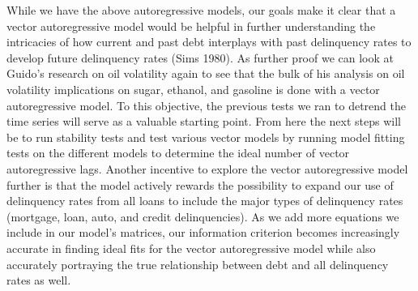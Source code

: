 \documentclass[11pt, oneside]{article}   	%
\begin{document}
While we have the above autoregressive models, our goals make it clear that a vector autoregressive model would be helpful in further understanding the intricacies of how current and past debt interplays with past delinquency rates to develop future delinquency rates (Sims 1980). As further proof we can look at Guido’s research on oil volatility again to see that the bulk of his analysis on oil volatility implications on sugar, ethanol, and gasoline is done with a vector autoregressive model. To this objective, the previous tests we ran to detrend the time series will serve as a valuable starting point. From here the next steps will be to run stability tests and test various vector models by running model fitting tests on the different models to determine the ideal number of vector autoregressive lags. Another incentive to explore the vector autoregressive model further is that the model actively rewards the possibility to expand our use of delinquency rates from all loans to include the major types of  delinquency rates (mortgage, loan, auto, and credit delinquencies). As we add more equations we include in our model’s matrices, our information criterion becomes increasingly accurate in finding ideal fits for the vector autoregressive model while also accurately portraying the true relationship between debt and all delinquency rates as well. 




\end{document}
